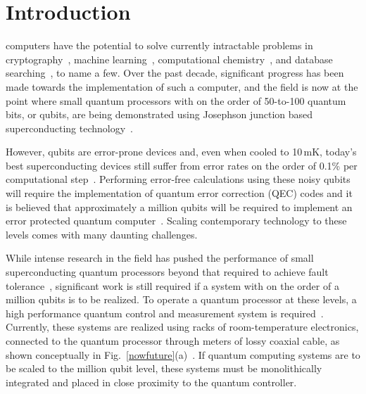 \documentclass[journal]{IEEEtran}
\newcommand{\CR}[1]{{\color{black}#1}}
\begin{document}
\section{Introduction}
 computers have the potential to solve currently intractable  problems in cryptography~\cite{shor1994algorithms}, machine learning~\cite{biamonte2017quantum}, computational chemistry~\cite{lanyon2010towards}, and database searching~\cite{grover1996fast}, to name a few. Over the past decade, significant progress has been made towards the implementation of such a computer, and the field is now at the point where small quantum processors with on the order of 50-to-100 quantum bits, or qubits, are being demonstrated \CR{using Josephson junction based superconducting technology}~\cite{IBM,Google,Intel}. 

However, qubits are error-prone devices and, even when cooled to 10\,mK, today's best \CR{superconducting} devices still suffer from error rates on the order of 0.1\% per computational step~\cite{barends2014superconducting}. Performing error-free calculations using these noisy qubits will require the implementation of quantum error correction (QEC) codes and it is believed that approximately a million qubits will be required to implement an error protected quantum computer~\cite{fowler2012surface}. Scaling contemporary technology to these levels comes with many daunting challenges.


While intense research in the field has pushed the performance of small \CR{superconducting} quantum processors beyond that required to achieve fault tolerance~\cite{barends2014superconducting}, significant work is still required if a system with on the order of a million qubits is to be realized. To operate a quantum processor at these levels, a high performance quantum control and measurement system is required~\cite{van2018impact}. Currently, these systems are realized using racks of room-temperature electronics, connected to the quantum processor through meters of lossy coaxial cable, as shown conceptually in Fig.~\ref{nowfuture}(a)~\cite{barends2014superconducting}. If quantum computing systems are to be scaled to the million qubit level, these systems must be monolithically integrated and placed in close proximity to the quantum controller. 
\end{document}

